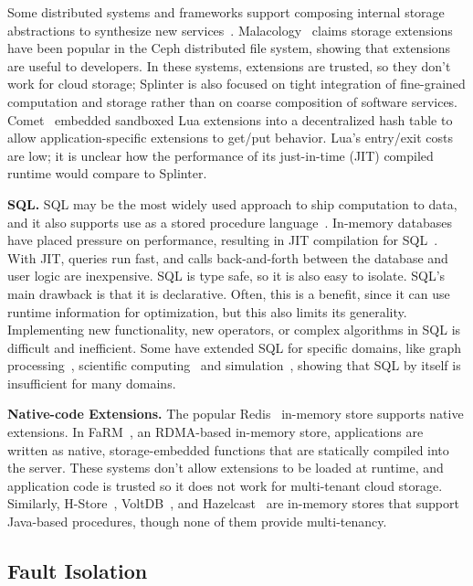 Some distributed systems and frameworks support composing internal storage
abstractions to synthesize new
services~\cite{corfu,tango,istore,sdds,boxwood,malacology}.
Malacology~\cite{malacology} claims storage extensions have been popular
in the Ceph distributed file system, showing that extensions are useful to
developers. In these systems, extensions are trusted, so they don't work for
cloud storage; Splinter is also focused on tight integration of fine-grained
computation and storage rather than on coarse composition of software services.
Comet~\cite{comet} embedded sandboxed Lua extensions into a decentralized hash
table to allow application-specific extensions to get/put behavior.
Lua's entry/exit costs are low; it is unclear how the performance of its
just-in-time (JIT) compiled runtime would compare to Splinter.

\textbf{SQL.}
%
SQL may be the most widely used approach to ship computation to data,
and it also supports use as a stored procedure language~\cite{tsql,plsql}.
In-memory databases
have placed pressure on performance, resulting
in JIT compilation for SQL~\cite{hekaton-compile,hyper-llvm}. With JIT,
queries run fast, and calls
back-and-forth between the database and user logic are inexpensive. SQL is type
safe, so it is also easy to isolate. SQL's main
drawback is that it is declarative. Often, this is a benefit,
since it can use runtime information for optimization, but this also
limits its generality. Implementing new
functionality, new operators, or complex algorithms in SQL is difficult and
inefficient.
%
Some have extended SQL for specific domains, like graph
processing~\cite{neo4j}, scientific computing~\cite{gmm,scidb} and
simulation~\cite{simsql}, showing that SQL by itself is insufficient for many domains.

\textbf{Native-code Extensions.}
%
The popular
Redis~\cite{redis} in-memory store supports native extensions. In
FaRM~\cite{farm-2014,farm-txns}, an RDMA-based in-memory store, applications are written as
native, storage-embedded functions that are statically compiled into the
server.  These systems don't allow extensions to be loaded at runtime, and
application code is trusted so it does not work for multi-tenant cloud storage.
Similarly, H-Store~\cite{hstore}, VoltDB~\cite{voltdb}, and
Hazelcast~\cite{hazelcast} are in-memory stores that support Java-based
procedures, though none of them provide multi-tenancy.

\subsection{Fault Isolation}
\label{sec:sfi}

